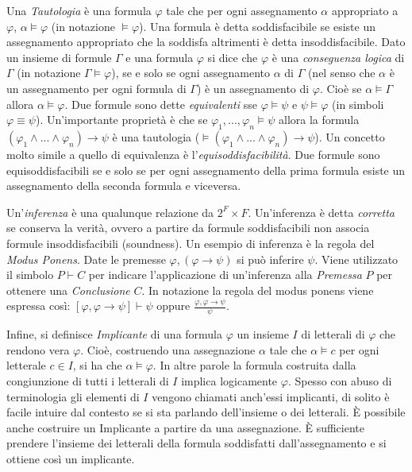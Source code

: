 \documentclass[./main.tex]{subfiles}
\begin{document}
Una \textit{Tautologia} è una formula $\varphi$ tale che per ogni assegnamento $\alpha$ appropriato a $\varphi$, $\alpha \models \varphi$ (in notazione $\models \varphi$).
Una formula è detta soddisfacibile se esiste un assegnamento appropriato che la soddisfa altrimenti è detta insoddisfacibile.
%
Dato un insieme di formule $\Gamma$ e una formula $\varphi$ si dice che $\varphi$ è una \textit{conseguenza logica} di $\Gamma$ (in notazione $\Gamma \models \varphi$),
se e solo se ogni assegnamento $\alpha$ di $\Gamma$ (nel senso che $\alpha$ è un assegnamento per ogni formula di $\Gamma$) è un assegnamento di $\varphi$. 
Cioè se $\alpha \models \Gamma$ allora $\alpha \models \varphi$.
Due formule sono dette \textit{equivalenti} sse $\varphi \models \psi$ e $\psi \models \varphi$ (in simboli $\varphi \equiv \psi$).
Un'importante proprietà è che se $\varphi_1, ..., \varphi_n \models \psi$ allora la formula $(\varphi_1 \land ... \land \varphi_n) \rightarrow \psi$ 
è una tautologia ($\models (\varphi_1 \land ... \land \varphi_n) \rightarrow \psi$).
Un concetto molto simile a quello di equivalenza è l'\textit{equisoddisfacibilità}. 
Due formule sono equisoddisfacibili se e solo se per ogni assegnamento della prima formula esiste un assegnamento della seconda formula e viceversa.

Un'\textit{inferenza} è una qualunque relazione da $2^F \times F$. Un'inferenza è detta \textit{corretta} se conserva la verità, ovvero 
a partire da formule soddisfacibili non associa formule insoddisfacibili (soundness).
Un esempio di inferenza è la regola del \textit{Modus Ponens}. Date le premesse $\varphi, (\varphi \rightarrow \psi)$ si può inferire $\psi$.
Viene utilizzato il simbolo $P \vdash C$ per indicare l'applicazione di un'inferenza alla \textit{Premessa} $P$ per ottenere una \textit{Conclusione} $C$.
In notazione la regola del modus ponens viene espressa così: $[\varphi, \varphi \rightarrow \psi] \vdash \psi$ oppure
$\frac{\varphi, \varphi \rightarrow \psi}{\psi} $.

Infine, si definisce \textit{Implicante} di una formula $\varphi$ un insieme $I$ di letterali di $\varphi$ che rendono vera $\varphi$. Cioè, costruendo una
assegnazione $\alpha$ tale che $\alpha \models c$ per ogni letterale $c \in I$, si ha che $\alpha \models \varphi$. In altre parole la formula 
costruita dalla congiunzione di tutti i letterali di $I$ implica logicamente $\varphi$. Spesso con abuso di terminologia gli elementi di $I$ vengono chiamati
anch'essi implicanti, di solito è facile intuire dal contesto se si sta parlando dell'insieme o dei letterali.
È possibile anche costruire un Implicante a partire da una assegnazione. È sufficiente prendere l'insieme dei letterali della formula soddisfatti dall'assegnamento e 
si ottiene così un implicante.
\end{document}
